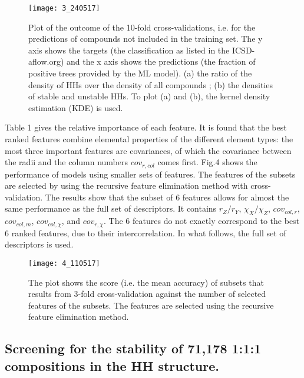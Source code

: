 \documentclass[pt10,journal=jacsat,manuscript=article,layout=twocolumn]{achemso}
\begin{document}
\begin{figure}
\texttt{[image: 3\_240517]}

\caption{Plot of the outcome of the 10-fold cross-validations, i.e. for the predictions of compounds not included in the training set. The y axis shows the targets (the classification as listed in the ICSD-aflow.org) and the x axis shows the predictions (the fraction of positive trees provided by the ML model). (a) the ratio of the density of HHs over the density of all compounds ; (b) the densities of stable and unstable HHs. To plot (a) and (b), the kernel density estimation (KDE) is used.}

\end{figure}

Table 1 gives the relative importance of each feature. It is found that the best ranked features combine elemental properties of the different element types: the most three important features are covariances, of which the covariance between the radii and the column numbers $cov_{r,col}$ comes first. Fig.4 shows the performance of models using smaller sets of features. The features of the subsets are selected by using the recursive feature elimination method with cross-validation. The results show that the subset of 6 features allows for almost the same performance as the full set of descriptors. It contains $r_Z/r_Y$, $\chi_X/\chi_Z$, $cov_{col,r}$, $cov_{col,m}$, $cov_{col,\chi}$, and $cov_{r,\chi}$. The 6 features do not exactly correspond to the best 6 ranked features, due to their intercorrelation. In what follows, the full set of descriptors is used.



\begin{figure}
\texttt{[image: 4\_110517]}

\caption{The plot shows the score (i.e. the mean accuracy) of subsets that results from 3-fold cross-validation against the number of selected features of the subsets. The features are selected using the recursive feature elimination method.}

\end{figure}


\subsection{Screening for the stability of 71,178 1:1:1 compositions in the HH structure.}
\end{document}

